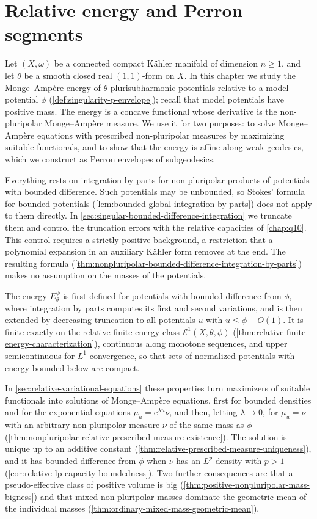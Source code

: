 \chapter{Relative energy and Perron segments}
\label{chap:q11}
Let $(X,\omega)$ be a connected compact K\"ahler manifold of dimension $n\geq1$, and let $\theta$ be a smooth closed real $(1,1)$-form on $X$. In this chapter we study the Monge--Amp\`ere energy of $\theta$-plurisubharmonic potentials relative to a model potential $\phi$ (\cref{def:singularity-p-envelope}); recall that model potentials have positive mass. The energy is a concave functional whose derivative is the non-pluripolar Monge--Amp\`ere measure. We use it for two purposes: to solve Monge--Amp\`ere equations with prescribed non-pluripolar measures by maximizing suitable functionals, and to show that the energy is affine along weak geodesics, which we construct as Perron envelopes of subgeodesics.

Everything rests on integration by parts for non-pluripolar products of potentials with bounded difference. Such potentials may be unbounded, so Stokes' formula for bounded potentials (\cref{lem:bounded-global-integration-by-parts}) does not apply to them directly. In \cref{sec:singular-bounded-difference-integration} we truncate them and control the truncation errors with the relative capacities of \cref{chap:q10}. This control requires a strictly positive background, a restriction that a polynomial expansion in an auxiliary K\"ahler form removes at the end. The resulting formula (\cref{thm:nonpluripolar-bounded-difference-integration-by-parts}) makes no assumption on the masses of the potentials.

The energy $E_\theta^\phi$ is first defined for potentials with bounded difference from $\phi$, where integration by parts computes its first and second variations, and is then extended by decreasing truncation to all potentials $u$ with $u\leq\phi+O(1)$. It is finite exactly on the relative finite-energy class $\mathcal E^1(X,\theta,\phi)$ (\cref{thm:relative-finite-energy-characterization}), continuous along monotone sequences, and upper semicontinuous for $L^1$ convergence, so that sets of normalized potentials with energy bounded below are compact.

In \cref{sec:relative-variational-equations} these properties turn maximizers of suitable functionals into solutions of Monge--Amp\`ere equations, first for bounded densities and for the exponential equations $\mu_u=\mathrm e^{\lambda u}\nu$, and then, letting $\lambda\to0$, for $\mu_u=\nu$ with an arbitrary non-pluripolar measure $\nu$ of the same mass as $\phi$ (\cref{thm:nonpluripolar-relative-prescribed-measure-existence}). The solution is unique up to an additive constant (\cref{thm:relative-prescribed-measure-uniqueness}), and it has bounded difference from $\phi$ when $\nu$ has an $L^p$ density with $p>1$ (\cref{cor:relative-lp-capacity-boundedness}). Two further consequences are that a pseudo-effective class of positive volume is big (\cref{thm:positive-nonpluripolar-mass-bigness}) and that mixed non-pluripolar masses dominate the geometric mean of the individual masses (\cref{thm:ordinary-mixed-mass-geometric-mean}).

